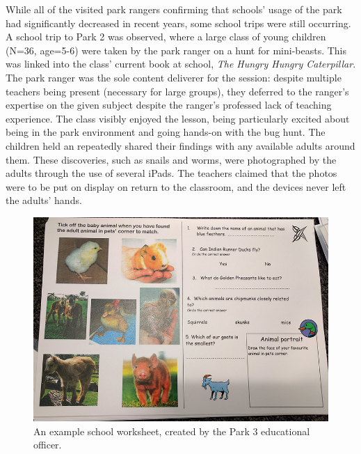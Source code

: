 While all of the visited park rangers confirming that schools’ usage of the park had significantly decreased in recent years, some school trips were still occurring. A school trip to Park 2 was observed, where a large class of young children (N=36, age=5-6) were taken by the park ranger on a hunt for mini-beasts. This was linked into the class' current book at school, \textit{The Hungry Hungry Caterpillar}. The park ranger was the sole content deliverer for the session: despite multiple teachers being present (necessary for large groups), they deferred to the ranger's expertise on the given subject despite the ranger's professed lack of teaching experience. The class visibly enjoyed the lesson, being particularly excited about being in the park environment and going hands-on with the bug hunt. The children held an repeatedly shared their findings with any available adults around them. These discoveries, such as snails and worms, were photographed by the adults through the use of several iPads. The teachers claimed that the photos were to be put on display on return to the classroom, and the devices never left the adults' hands.

\begin{figure}
  \centering
  \includegraphics[width=0.8\columnwidth]{images/chapter04/worksheet.jpg}
  \caption[An existing park worksheet]{An example school worksheet, created by the Park 3 educational officer.}
  \label{fig:worksheet}
\end{figure}

